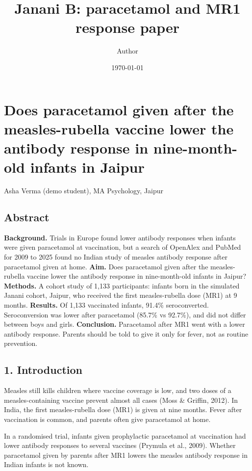 \documentclass[12pt]{article}
\title{Janani B: paracetamol and MR1 response paper}
\author{Author}
\date{\today}
\begin{document}
\maketitle

\section{Does paracetamol given after the measles-rubella vaccine lower the antibody response in nine-month-old infants in Jaipur}

Asha Verma (demo student), MA Psychology, Jaipur

\subsection{Abstract}

\textbf{Background.} Trials in Europe found lower antibody responses when infants were given paracetamol at vaccination, but a search of OpenAlex and PubMed for 2009 to 2025 found no Indian study of measles antibody response after paracetamol given at home. \textbf{Aim.} Does paracetamol given after the measles-rubella vaccine lower the antibody response in nine-month-old infants in Jaipur? \textbf{Methods.} A cohort study of 1,133 participants: infants born in the simulated Janani cohort, Jaipur, who received the first measles-rubella dose (MR1) at 9 months. \textbf{Results.} Of 1,133 vaccinated infants, 91.4\% seroconverted. Seroconversion was lower after paracetamol (85.7\% vs 92.7\%), and did not differ between boys and girls. \textbf{Conclusion.} Paracetamol after MR1 went with a lower antibody response. Parents should be told to give it only for fever, not as routine prevention.

\subsection{1. Introduction}

Measles still kills children where vaccine coverage is low, and two doses of a measles-containing vaccine prevent almost all cases (Moss \& Griffin, 2012). In India, the first measles-rubella dose (MR1) is given at nine months. Fever after vaccination is common, and parents often give paracetamol at home.

In a randomised trial, infants given prophylactic paracetamol at vaccination had lower antibody responses to several vaccines (Prymula et al., 2009). Whether paracetamol given by parents after MR1 lowers the measles antibody response in Indian infants is not known.
\end{document}
